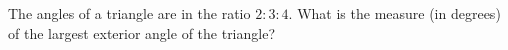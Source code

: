 The angles of a triangle are in the ratio $2:3:4$. What is the measure (in degrees) of the largest exterior angle of the triangle?
